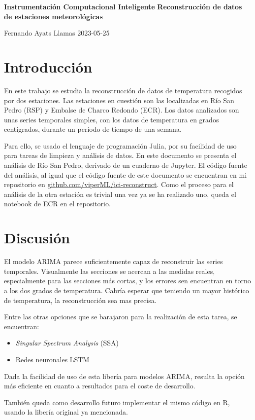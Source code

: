 \begin{center}
    \Large
    \textbf{Instrumentación Computacional Inteligente}
    \textbf{Reconstrucción de datos de estaciones meteorológicas}

    \vspace{0.3cm}
    \Large
    Fernando Ayats Llamas
    \vspace{0.3cm}
    2023-05-25
\end{center}

\tableofcontents

\section{Introducción}

En este trabajo se estudia la reconstrucción de datos de temperatura recogidos
por dos estaciones. Las estaciones en cuestión son las localizadas en Río San
Pedro (RSP) y Embalse de Charco Redondo (ECR). Los datos analizados son unas
series temporales simples, con los datos de temperatura en grados centígrados,
durante un período de tiempo de una semana.

Para ello, se usado el lenguaje de programación Julia, por su facilidad de uso
para tareas de limpieza y análisis de datos. En este documento se presenta el
análisis de Río San Pedro, derivado de un cuaderno de Jupyter. El código fuente
del análisis, al igual que el código fuente de este documento se encuentran en
mi repositorio en \href{https://github.com/viperML/ici-reconstruct}{github.com/viperML/ici-reconstruct}. Como el
proceso para el análisis de la otra estación es trivial una vez ya se ha
realizado uno, queda el notebook de ECR en el repositorio.



\section{Discusión}

El modelo ARIMA parece suficientemente capaz de reconstruir las series
temporales. Visualmente las secciones se acercan a las medidas reales,
especialmente para las secciones más cortas, y los errores sen encuentran en
torno a los dos grados de temperatura. Cabría esperar que teniendo un
mayor histórico de temperatura, la reconstrucción sea mas precisa.

Entre las otras opciones que se barajaron para la realización de esta tarea, se
encuentran:

\begin{itemize}
    \item \textit{Singular Spectrum Analysis} (SSA)
    \item Redes neuronales LSTM
\end{itemize}

Dada la facilidad de uso de esta libería para modelos ARIMA, resulta la opción
más eficiente en cuanto a resultados para el coste de desarrollo.

También queda como desarrollo futuro implementar el mismo código en R, usando la
libería original ya mencionada.